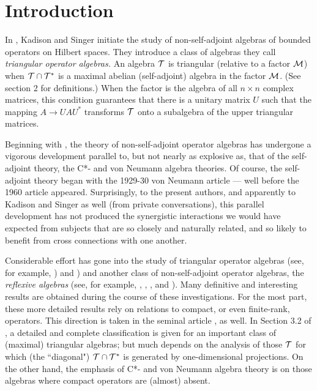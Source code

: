 \section{Introduction}

In \cite{KS}, Kadison and Singer initiate the study of
non-self-adjoint algebras of bounded operators on Hilbert spaces.
They introduce a class of algebras they call {\it triangular
operator algebras.}  An algebra $\mathcal T$ is triangular (relative to a
factor $\mathcal M$) when $\mathcal T\cap\mathcal T^*$ is a maximal abelian (self-adjoint)
algebra in the factor $\mathcal M$.  (See section 2 for definitions.)  When
the factor is the algebra of all $n\times n$ complex matrices, this
condition guarantees that there is a unitary matrix $U$ such that
the mapping $A\to UAU^*$ transforms $\mathcal T$ onto a subalgebra of the
upper triangular matrices.

Beginning with \cite{KS}, the theory of non-self-adjoint operator
algebras has undergone a vigorous development parallel to, but not
nearly as explosive as, that of the self-adjoint theory, the C*- and
von Neumann algebra theories.  Of course, the self-adjoint theory
began with the 1929-30 von Neumann article \cite{vN} --- well before the
1960 \cite{KS} article appeared.  Surprisingly, to the present authors,
and apparently to Kadison and Singer as well (from private
conversations), this parallel development has not produced the
synergistic interactions we would have expected from subjects that
are so closely and naturally related, and so likely to benefit from
cross connections with one another.

Considerable effort has gone into the study of triangular operator
algebras (see, for example, \cite{MSS}) and \cite{Ho}) and another class of
non-self-adjoint operator algebras, the {\it reflexive algebras\/}
(see, for example, \cite{H2}, \cite{Hd}, \cite{RR}, and \cite{La}).  Many definitive and
interesting results are obtained during the course of these
investigations.  For the most part, these more detailed results rely
on relations to compact, or even finite-rank, operators.  This
direction is taken in the seminal article \cite{KS}, as well.  In Section
3.2 of \cite{KS}, a detailed and complete classification is given for an
important class of (maximal) triangular algebras; but much depends
on the analysis of those $\mathcal T$ for which (the ``diagonal")
$\mathcal T\cap\mathcal T^*$ is generated by one-dimensional projections.  On the
other hand, the emphasis of C*- and von Neumann algebra theory is on
those algebras where compact operators are (almost) absent.

